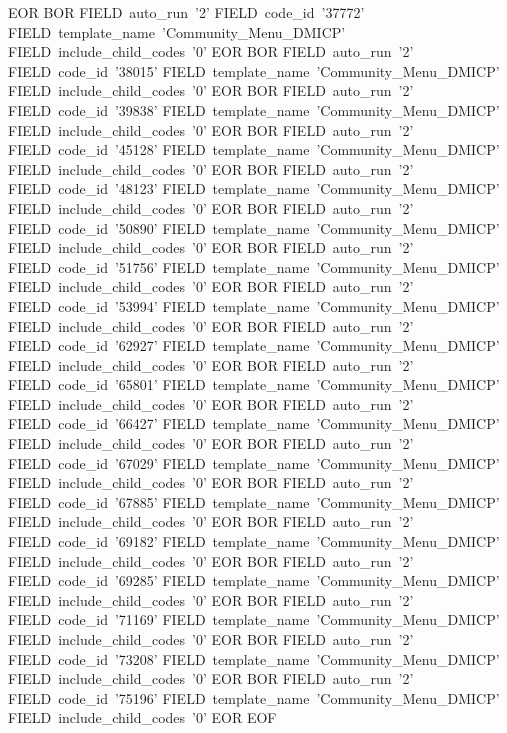   EOR
  BOR
    FIELD~auto_run~'2'
    FIELD~code_id~'37772'
    FIELD~template_name~'Community_Menu_DMICP'
    FIELD~include_child_codes~'0'
  EOR
  BOR
    FIELD~auto_run~'2'
    FIELD~code_id~'38015'
    FIELD~template_name~'Community_Menu_DMICP'
    FIELD~include_child_codes~'0'
  EOR
  BOR
    FIELD~auto_run~'2'
    FIELD~code_id~'39838'
    FIELD~template_name~'Community_Menu_DMICP'
    FIELD~include_child_codes~'0'
  EOR
  BOR
    FIELD~auto_run~'2'
    FIELD~code_id~'45128'
    FIELD~template_name~'Community_Menu_DMICP'
    FIELD~include_child_codes~'0'
  EOR
  BOR
    FIELD~auto_run~'2'
    FIELD~code_id~'48123'
    FIELD~template_name~'Community_Menu_DMICP'
    FIELD~include_child_codes~'0'
  EOR
  BOR
    FIELD~auto_run~'2'
    FIELD~code_id~'50890'
    FIELD~template_name~'Community_Menu_DMICP'
    FIELD~include_child_codes~'0'
  EOR
  BOR
    FIELD~auto_run~'2'
    FIELD~code_id~'51756'
    FIELD~template_name~'Community_Menu_DMICP'
    FIELD~include_child_codes~'0'
  EOR
  BOR
    FIELD~auto_run~'2'
    FIELD~code_id~'53994'
    FIELD~template_name~'Community_Menu_DMICP'
    FIELD~include_child_codes~'0'
  EOR
  BOR
    FIELD~auto_run~'2'
    FIELD~code_id~'62927'
    FIELD~template_name~'Community_Menu_DMICP'
    FIELD~include_child_codes~'0'
  EOR
  BOR
    FIELD~auto_run~'2'
    FIELD~code_id~'65801'
    FIELD~template_name~'Community_Menu_DMICP'
    FIELD~include_child_codes~'0'
  EOR
  BOR
    FIELD~auto_run~'2'
    FIELD~code_id~'66427'
    FIELD~template_name~'Community_Menu_DMICP'
    FIELD~include_child_codes~'0'
  EOR
  BOR
    FIELD~auto_run~'2'
    FIELD~code_id~'67029'
    FIELD~template_name~'Community_Menu_DMICP'
    FIELD~include_child_codes~'0'
  EOR
  BOR
    FIELD~auto_run~'2'
    FIELD~code_id~'67885'
    FIELD~template_name~'Community_Menu_DMICP'
    FIELD~include_child_codes~'0'
  EOR
  BOR
    FIELD~auto_run~'2'
    FIELD~code_id~'69182'
    FIELD~template_name~'Community_Menu_DMICP'
    FIELD~include_child_codes~'0'
  EOR
  BOR
    FIELD~auto_run~'2'
    FIELD~code_id~'69285'
    FIELD~template_name~'Community_Menu_DMICP'
    FIELD~include_child_codes~'0'
  EOR
  BOR
    FIELD~auto_run~'2'
    FIELD~code_id~'71169'
    FIELD~template_name~'Community_Menu_DMICP'
    FIELD~include_child_codes~'0'
  EOR
  BOR
    FIELD~auto_run~'2'
    FIELD~code_id~'73208'
    FIELD~template_name~'Community_Menu_DMICP'
    FIELD~include_child_codes~'0'
  EOR
  BOR
    FIELD~auto_run~'2'
    FIELD~code_id~'75196'
    FIELD~template_name~'Community_Menu_DMICP'
    FIELD~include_child_codes~'0'
  EOR
EOF

